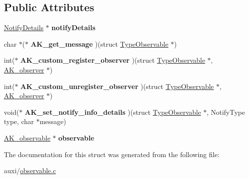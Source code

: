 \subsection*{Public Attributes}
\begin{DoxyCompactItemize}
\item 
\mbox{\label{structTypeObservable_adca7a1d0ca6ef5909ac6b55632e449f3}} 
\hyperlink{struct__notifyDetails}{Notify\+Details} $\ast$ {\bfseries notify\+Details}
\item 
\mbox{\label{structTypeObservable_afd8b2fc01696766f4a01795f4bc03d86}} 
char $\ast$($\ast$ {\bfseries A\+K\+\_\+get\+\_\+message} )(struct \hyperlink{structTypeObservable}{Type\+Observable} $\ast$)
\item 
\mbox{\label{structTypeObservable_ad289fe874765ebdb1170d4ba60452479}} 
int($\ast$ {\bfseries A\+K\+\_\+custom\+\_\+register\+\_\+observer} )(struct \hyperlink{structTypeObservable}{Type\+Observable} $\ast$, \hyperlink{structObserver}{A\+K\+\_\+observer} $\ast$)
\item 
\mbox{\label{structTypeObservable_a57122de0c36b877d36ebe37431f1c083}} 
int($\ast$ {\bfseries A\+K\+\_\+custom\+\_\+unregister\+\_\+observer} )(struct \hyperlink{structTypeObservable}{Type\+Observable} $\ast$, \hyperlink{structObserver}{A\+K\+\_\+observer} $\ast$)
\item 
\mbox{\label{structTypeObservable_a068a389191cf399adc2af461ba936424}} 
void($\ast$ {\bfseries A\+K\+\_\+set\+\_\+notify\+\_\+info\+\_\+details} )(struct \hyperlink{structTypeObservable}{Type\+Observable} $\ast$, Notify\+Type type, char $\ast$message)
\item 
\mbox{\label{structTypeObservable_abe8d23a8beccdc02d95525f6dca2dc2b}} 
\hyperlink{structObservable}{A\+K\+\_\+observable} $\ast$ {\bfseries observable}
\end{DoxyCompactItemize}


The documentation for this struct was generated from the following file\+:\begin{DoxyCompactItemize}
\item 
auxi/\hyperlink{observable_8c}{observable.\+c}\end{DoxyCompactItemize}
